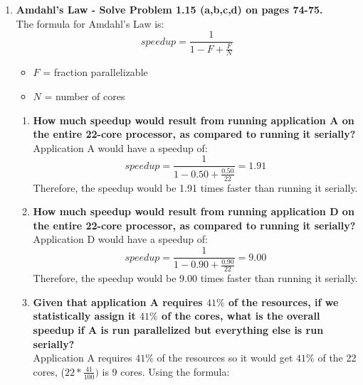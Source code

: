 \begin{enumerate}
    \item \textbf{Amdahl's Law - Solve Problem 1.15 (a,b,c,d) on pages 74-75.} \\
          The formula for Amdahl's Law is:
          \begin{equation*}
              speedup = \frac{1}{1-F + \frac{F}{N}}
          \end{equation*}
          \begin{itemize}
              \item $F$ = fraction parallelizable
              \item $N$ = number of cores
          \end{itemize}
          \begin{enumerate}
              \item \textbf{How much speedup would result from running application A on the entire 22-core processor, as compared to running it serially?} \\
                    Application A would have a speedup of:
                    \begin{equation*}
                        speedup = \frac{1}{1-0.50 + \frac{0.50}{22}} = 1.91
                    \end{equation*}
                    Therefore, the speedup would be 1.91 times faster than running it serially.
              \item \textbf{How much speedup would result from running application D on the entire 22-core processor, as compared to running it serially?} \\
                    Application D would have a speedup of:
                    \begin{equation*}
                        speedup = \frac{1}{1-0.90 + \frac{0.90}{22}} = 9.00
                    \end{equation*}
                    Therefore, the speedup would be 9.00 times faster than running it serially.
              \item \textbf{Given that application A requires $41\%$ of the resources, if we statistically assign it $41\%$ of the cores, what is the overall speedup if A is run parallelized but everything else is run serially?} \\
                    Application A requires $41\%$ of the resources so it would get $41\%$ of the 22 cores, ($22 * \frac{41}{100})$ is 9 cores. Using the formula:
                    \begin{equation*}

\end{equation*}
\end{enumerate}
\end{enumerate}
